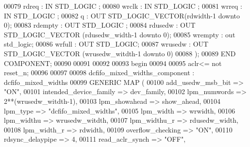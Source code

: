 \begin{DoxyCode}
00079             rdreq      : \textcolor{keywordflow}{IN} \textcolor{comment}{STD\_LOGIC} ;
00080             wrclk      : \textcolor{keywordflow}{IN} \textcolor{comment}{STD\_LOGIC} ;
00081             wrreq      : \textcolor{keywordflow}{IN} \textcolor{comment}{STD\_LOGIC} ;
00082             q           : \textcolor{keywordflow}{OUT} \textcolor{comment}{STD\_LOGIC\_VECTOR}(rdwidth\textcolor{vhdlchar}{-}\textcolor{vhdllogic}{}\textcolor{vhdllogic}{1} \textcolor{keywordflow}{downto} \textcolor{vhdllogic}{}\textcolor{vhdllogic}{0});
00083             rdempty : \textcolor{keywordflow}{OUT} \textcolor{comment}{STD\_LOGIC} ;
00084             rdusedw : \textcolor{keywordflow}{OUT} \textcolor{comment}{STD\_LOGIC\_VECTOR} (rdusedw\_width\textcolor{vhdlchar}{-}\textcolor{vhdllogic}{}\textcolor{vhdllogic}{1} \textcolor{keywordflow}{downto} \textcolor{vhdllogic}{}\textcolor{vhdllogic}{0}); 
00085             wrempty : \textcolor{keywordflow}{out} \textcolor{comment}{std\_logic};
00086             wrfull  : \textcolor{keywordflow}{OUT} \textcolor{comment}{STD\_LOGIC};
00087             wrusedw : \textcolor{keywordflow}{OUT} \textcolor{comment}{STD\_LOGIC\_VECTOR} (wrusedw\_witdth\textcolor{vhdlchar}{-}\textcolor{vhdllogic}{}\textcolor{vhdllogic}{1} \textcolor{keywordflow}{downto} \textcolor{vhdllogic}{}\textcolor{vhdllogic}{0})
00088     );
00089     \textcolor{keywordflow}{END} \textcolor{keywordflow}{COMPONENT};
00090     
00091 
00092   
00093 \textcolor{vhdlkeyword}{begin}
00094   
00095   \textcolor{vhdlchar}{aclr}\textcolor{vhdlchar}{<=} \textcolor{keywordflow}{not} \textcolor{vhdlchar}{reset_n};
00096   
00097   
00098     dcfifo_mixed_widths_component : dcfifo\_mixed\_widths
00099     \textcolor{keywordflow}{GENERIC} \textcolor{keywordflow}{MAP} (
00100         add\_usedw\_msb\_bit       => \textcolor{keyword}{"ON"},
00101         intended\_device\_family  => dev_family,
00102         lpm\_numwords            => \textcolor{vhdllogic}{2**}\textcolor{vhdlchar}{(}wrusedw_witdth-\textcolor{vhdllogic}{1}\textcolor{vhdlchar}{)},
00103         lpm\_showahead           => show_ahead,
00104         lpm\_type                => \textcolor{keyword}{"dcfifo\_mixed\_widths"},
00105         lpm\_width               => wrwidth,
00106         lpm\_widthu              => wrusedw_witdth,
00107         lpm\_widthu\_r            => rdusedw_width,
00108         lpm\_width\_r             => rdwidth,
00109         overflow\_checking       => \textcolor{keyword}{"ON"},
00110         rdsync\_delaypipe        => \textcolor{vhdllogic}{4},
00111         read\_aclr\_synch         => \textcolor{keyword}{"OFF"},

\end{DoxyCode}
